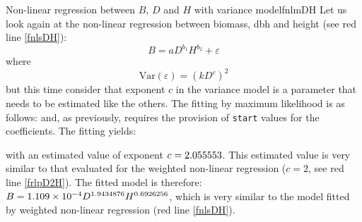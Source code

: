 \begin{filrouge}{Non-linear regression between $B$, $D$ and $H$ with variance model}{fnlmDH}%
Let us look again at the non-linear regression between biomass, dbh and height (see red line \ref{fnlsDH}):
\[
B=aD^{b_1}H^{b_2}+\varepsilon
\]
where
\[
\mathrm{Var}(\varepsilon)=(kD^c)^2
\]
but this time consider that exponent $c$ in the variance model is a parameter that needs to be estimated like the others. The fitting by maximum likelihood is as follows:
%
and, as previously, requires the provision of \texttt{start} values for the coefficients. The fitting yields:

%
with an estimated value of exponent $c=\mbox{2.055553}$. This estimated value is very similar to that evaluated for the weighted non-linear regression ($c=2$, see red line \ref{frlpD2H}). The fitted model is therefore: $B=\mbox{1.109}\times10^{-4}D^{1.9434876}H^{0.6926256}$, which is very similar to the model fitted by weighted non-linear regression (red line \ref{fnlsDH}).
\end{filrouge}

